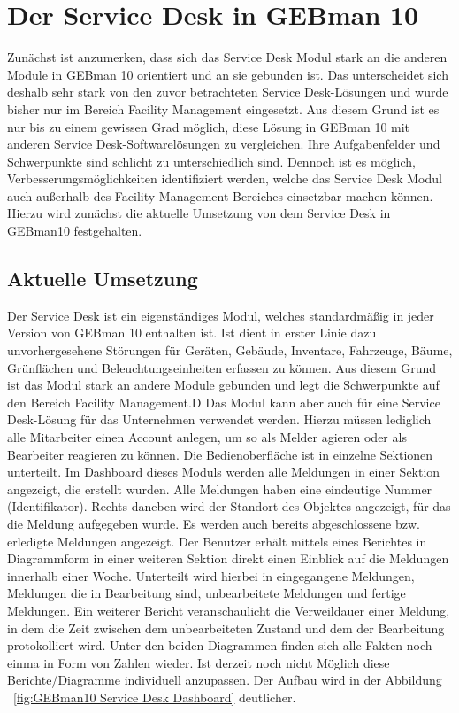 
\section{Der Service Desk in GEBman 10}
\noindent
Zunächst ist anzumerken, dass sich das Service Desk Modul stark an die anderen Module in GEBman 10 orientiert und an sie gebunden ist. Das unterscheidet sich deshalb sehr stark von den zuvor betrachteten Service Desk-Lösungen und wurde bisher nur im Bereich Facility Management eingesetzt. Aus diesem Grund ist es nur bis zu einem gewissen Grad möglich, diese Lösung in GEBman 10 mit anderen Service Desk-Softwarelösungen zu vergleichen. Ihre Aufgabenfelder und Schwerpunkte sind schlicht zu unterschiedlich sind. Dennoch ist es möglich, Verbesserungsmöglichkeiten identifiziert werden, welche das Service Desk Modul auch außerhalb des Facility Management Bereiches einsetzbar machen können. Hierzu wird zunächst die aktuelle Umsetzung von dem Service Desk in GEBman10 festgehalten.


\subsection{Aktuelle Umsetzung}
\noindent
Der Service Desk  ist ein eigenständiges Modul, welches standardmäßig in jeder Version von GEBman 10 enthalten ist. Ist dient in erster Linie dazu unvorhergesehene Störungen für Geräten, Gebäude, Inventare, Fahrzeuge, Bäume, Grünflächen und Beleuchtungseinheiten erfassen zu können. Aus diesem Grund ist das Modul stark an andere Module gebunden und legt die Schwerpunkte auf den Bereich Facility Management.D Das Modul kann aber auch für eine Service Desk-Lösung für das Unternehmen verwendet werden. Hierzu müssen lediglich alle Mitarbeiter einen Account anlegen, um so als Melder agieren oder als Bearbeiter reagieren zu können. \newline 
Die Bedienoberfläche ist in einzelne Sektionen unterteilt. Im Dashboard dieses Moduls werden alle Meldungen in einer Sektion angezeigt, die erstellt wurden. Alle Meldungen haben eine eindeutige Nummer (Identifikator). Rechts daneben wird der Standort des Objektes angezeigt, für das die Meldung aufgegeben wurde. Es werden auch bereits abgeschlossene bzw. erledigte Meldungen angezeigt. Der Benutzer erhält mittels eines Berichtes in Diagrammform in einer weiteren Sektion direkt einen Einblick auf die Meldungen innerhalb einer Woche. Unterteilt wird hierbei in eingegangene Meldungen, Meldungen die in Bearbeitung sind, unbearbeitete Meldungen und fertige Meldungen. Ein weiterer Bericht veranschaulicht die Verweildauer einer Meldung, in dem die Zeit zwischen dem unbearbeiteten Zustand und dem der Bearbeitung protokolliert wird. Unter den beiden Diagrammen finden sich alle Fakten noch einma in Form von Zahlen wieder. Ist derzeit noch nicht Möglich diese Berichte/Diagramme individuell anzupassen. Der Aufbau wird in der Abbildung ~\ref{fig:GEBman10 Service Desk Dashboard} deutlicher. 

